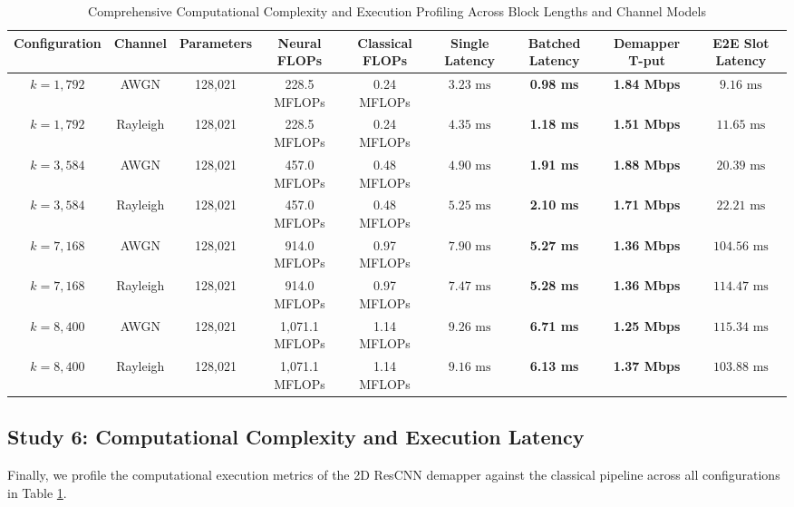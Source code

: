 \documentclass[journal]{IEEEtran}
\begin{document}
\begin{table}[!t]
\caption{Comprehensive Computational Complexity and Execution Profiling Across Block Lengths and Channel Models}
\label{tab:complexity_master}
\centering
\begin{tabular}{ccccccccc}
\toprule
\textbf{Configuration} & \textbf{Channel} & \textbf{Parameters} & \textbf{Neural FLOPs} & \textbf{Classical FLOPs} & \textbf{Single Latency} & \textbf{Batched Latency} & \textbf{Demapper T-put} & \textbf{E2E Slot Latency} \\
\midrule
$k=1,792$ & AWGN & 128,021 & 228.5 MFLOPs & 0.24 MFLOPs & $3.23\text{ ms}$ & \textbf{0.98 ms} & \textbf{1.84 Mbps} & $9.16\text{ ms}$ \\
$k=1,792$ & Rayleigh & 128,021 & 228.5 MFLOPs & 0.24 MFLOPs & $4.35\text{ ms}$ & \textbf{1.18 ms} & \textbf{1.51 Mbps} & $11.65\text{ ms}$ \\
\midrule
$k=3,584$ & AWGN & 128,021 & 457.0 MFLOPs & 0.48 MFLOPs & $4.90\text{ ms}$ & \textbf{1.91 ms} & \textbf{1.88 Mbps} & $20.39\text{ ms}$ \\
$k=3,584$ & Rayleigh & 128,021 & 457.0 MFLOPs & 0.48 MFLOPs & $5.25\text{ ms}$ & \textbf{2.10 ms} & \textbf{1.71 Mbps} & $22.21\text{ ms}$ \\
\midrule
$k=7,168$ & AWGN & 128,021 & 914.0 MFLOPs & 0.97 MFLOPs & $7.90\text{ ms}$ & \textbf{5.27 ms} & \textbf{1.36 Mbps} & $104.56\text{ ms}$ \\
$k=7,168$ & Rayleigh & 128,021 & 914.0 MFLOPs & 0.97 MFLOPs & $7.47\text{ ms}$ & \textbf{5.28 ms} & \textbf{1.36 Mbps} & $114.47\text{ ms}$ \\
\midrule
$k=8,400$ & AWGN & 128,021 & 1,071.1 MFLOPs & 1.14 MFLOPs & $9.26\text{ ms}$ & \textbf{6.71 ms} & \textbf{1.25 Mbps} & $115.34\text{ ms}$ \\
$k=8,400$ & Rayleigh & 128,021 & 1,071.1 MFLOPs & 1.14 MFLOPs & $9.16\text{ ms}$ & \textbf{6.13 ms} & \textbf{1.37 Mbps} & $103.88\text{ ms}$ \\
\bottomrule
\end{tabular}
\end{table}

\subsection{Study 6: Computational Complexity and Execution Latency}
Finally, we profile the computational execution metrics of the 2D ResCNN demapper against the classical pipeline across all configurations in Table \ref{tab:complexity_master}.
\end{document}
